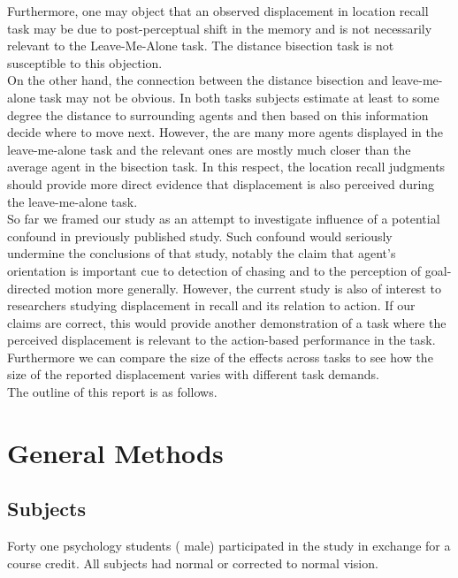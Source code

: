 \documentclass[10pt]{article}
\begin{document}
Furthermore, one may object that an observed displacement in location recall task may be due to post-perceptual shift in the memory and is not necessarily relevant to the Leave-Me-Alone task. 
The distance bisection task is not susceptible to this objection.\\
On the other hand, the connection between the distance bisection and leave-me-alone task may not be obvious. 
In both tasks subjects estimate at least to some degree the distance to surrounding agents and then based on this information decide where to move next. 
However, the are many more agents displayed in the leave-me-alone task and the relevant ones are mostly much closer than the average agent in the bisection task. 
In this respect, the location recall judgments should provide more direct evidence that displacement is also perceived during the leave-me-alone task. \\
So far we framed our study as an attempt to investigate influence of a potential confound in previously published study. 
Such confound would seriously undermine the conclusions of that study, notably the claim that agent's orientation is important cue to detection of chasing and to the perception of goal-directed motion more generally. %
However, the current study is also of interest to researchers studying displacement in recall and its relation to action. 
If our claims are correct, this would provide another demonstration of a task where the perceived displacement is relevant to the action-based performance in the task. %
Furthermore we can compare the size of the effects across tasks to see how the size of the reported displacement varies with different task demands.\\
The outline of this report is as follows. %


\section*{General Methods}
\subsection*{Subjects}
Forty one psychology students ( male) participated in the study in exchange for a course credit. %
All subjects had normal or corrected to normal vision.
\end{document}
